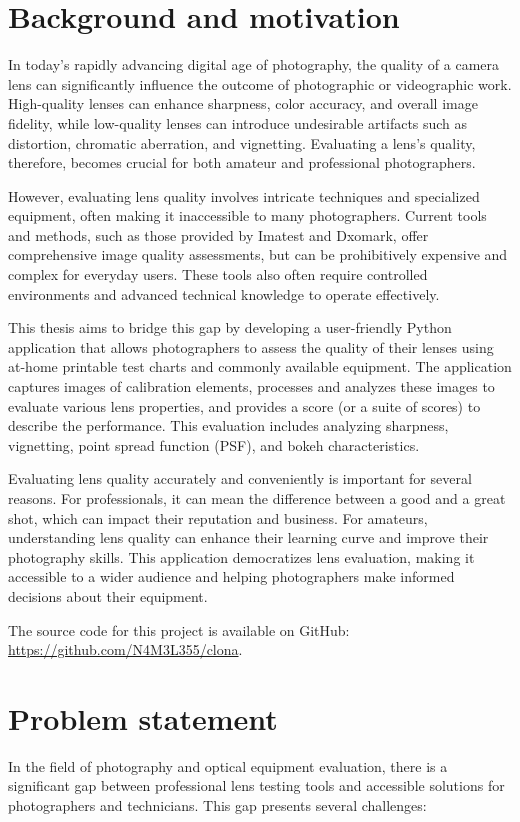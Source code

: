 \section*{Background and motivation}
In today's rapidly advancing digital age of photography, the quality of a camera lens can significantly influence the outcome of photographic or videographic work. High-quality lenses can enhance sharpness, color accuracy, and overall image fidelity, while low-quality lenses can introduce undesirable artifacts such as distortion, chromatic aberration, and vignetting. Evaluating a lens's quality, therefore, becomes crucial for both amateur and professional photographers.

However, evaluating lens quality involves intricate techniques and specialized equipment, often making it inaccessible to many photographers. Current tools and methods, such as those provided by Imatest and Dxomark, offer comprehensive image quality assessments, but can be prohibitively expensive and complex for everyday users. These tools also often require controlled environments and advanced technical knowledge to operate effectively.

This thesis aims to bridge this gap by developing a user-friendly Python application that allows photographers to assess the quality of their lenses using at-home printable test charts and commonly available equipment. The application captures images of calibration elements, processes and analyzes these images to evaluate various lens properties, and provides a score (or a suite of scores) to describe the performance. This evaluation includes analyzing sharpness, vignetting, point spread function (PSF), and bokeh characteristics.


Evaluating lens quality accurately and conveniently is important for several reasons. For professionals, it can mean the difference between a good and a great shot, which can impact their reputation and business. For amateurs, understanding lens quality can enhance their learning curve and improve their photography skills. This application democratizes lens evaluation, making it accessible to a wider audience and helping photographers make informed decisions about their equipment.



The source code for this project is available on GitHub: \url{https://github.com/N4M3L355/clona}.
\section*{Problem statement}
In the field of photography and optical equipment evaluation, there is a significant gap between professional lens testing tools and accessible solutions for photographers and technicians. This gap presents several challenges:

